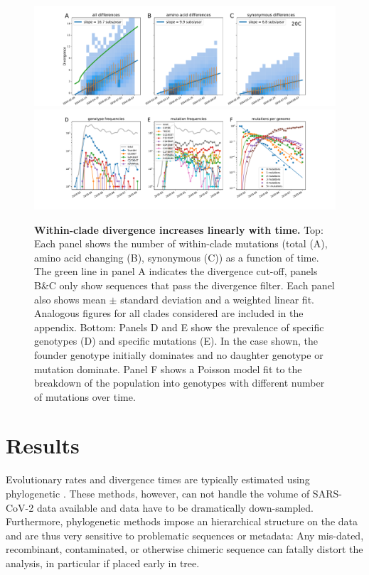 \documentclass[aps,rmp, twocolumn]{revtex4}
\begin{document}
\begin{figure}[tb]
    \includegraphics[width=\textwidth]{figures/rtt/20C_rtt.pdf}
    \includegraphics[width=\textwidth]{figures/counts/20C_counts.pdf}
    \caption{{\bf Within-clade divergence increases linearly with time.} Top: Each panel shows the number of within-clade mutations (total (A), amino acid changing (B), synonymous (C)) as a function of time.
    The green line in panel A indicates the divergence cut-off, panels B\&C only show sequences that pass the divergence filter. Each panel also shows mean $\pm$ standard deviation and a weighted linear fit. Analogous figures for all clades considered are included in the appendix.
    Bottom: Panels D and E show the prevalence of specific genotypes (D) and specific mutations (E). In the case shown, the founder genotype initially dominates and no daughter genotype or mutation dominate. Panel F shows a Poisson model fit to the breakdown of the population into genotypes with different number of mutations over time.
    \label{fig:within_clade}}
\end{figure}

\section*{Results}

Evolutionary rates and divergence times are typically estimated using phylogenetic \citep{drummond_relaxed_2006}.
These methods, however, can not handle the volume of SARS-CoV-2 data available and data have to be dramatically down-sampled.
Furthermore, phylogenetic methods impose an hierarchical structure on the data and are thus very sensitive to problematic sequences or metadata: Any mis-dated, recombinant, contaminated, or otherwise chimeric sequence can fatally distort the analysis, in particular if placed early in tree.
\end{document}
